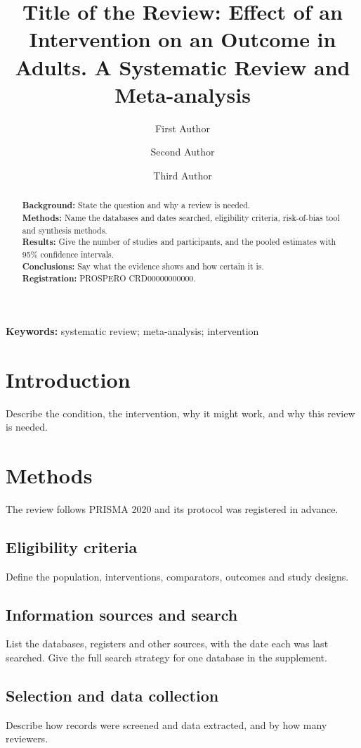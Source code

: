 \documentclass[11pt,a4paper]{article}
\title{Title of the Review: Effect of an Intervention on an Outcome in Adults. A Systematic Review and Meta-analysis}
\author[1]{First Author}
\author[1]{Second Author}
\author[2]{Third Author}
\affil[1]{Department of Medicine, University Hospital, City, Country}
\affil[2]{Library and Information Services, University, City, Country}
\date{}
\begin{document}
\maketitle

\begin{abstract}
\noindent\textbf{Background:} State the question and why a review is needed.\\
\textbf{Methods:} Name the databases and dates searched, eligibility criteria, risk-of-bias tool and synthesis methods.\\
\textbf{Results:} Give the number of studies and participants, and the pooled estimates with 95\% confidence intervals.\\
\textbf{Conclusions:} Say what the evidence shows and how certain it is.\\
\textbf{Registration:} PROSPERO CRD00000000000.
\end{abstract}

\noindent\textbf{Keywords:} systematic review; meta-analysis; intervention

\section{Introduction}
Describe the condition, the intervention, why it might work, and why this
review is needed.

\section{Methods}
The review follows PRISMA 2020\cite{page2021prisma} and its protocol was
registered in advance.

\subsection{Eligibility criteria}
Define the population, interventions, comparators, outcomes and study designs.

\subsection{Information sources and search}
List the databases, registers and other sources, with the date each was last
searched. Give the full search strategy for one database in the supplement.

\subsection{Selection and data collection}
Describe how records were screened and data extracted, and by how many reviewers.
\end{document}
